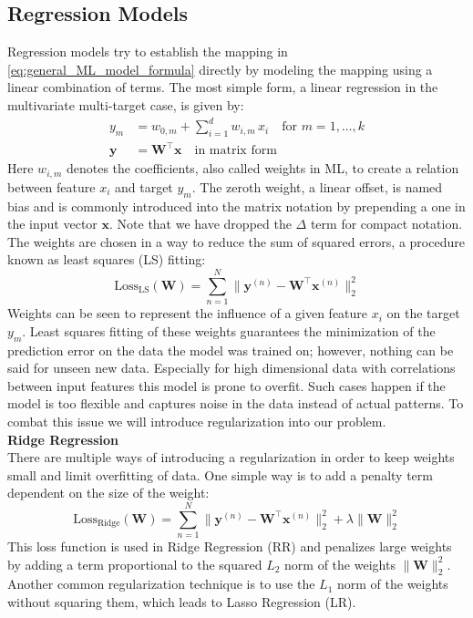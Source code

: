 \subsection{Regression Models}
\label{subsec:background_ml_model_types}
Regression models try to establish the mapping in \autoref{eq:general_ML_model_formula} directly by modeling the mapping using a linear combination of terms. The most simple form, a linear regression in the multivariate multi-target case, is given by: 
\begin{equation}
    \label{eq:linear_regression_formula}
    \begin{aligned}
        y_m &= w_{0, m} + \sum_{i=1}^d w_{i,m} \, x_i \quad \text{for } m = 1, \dots, k\\
        \mathbf{y} &= \mathbf{W^\top} \mathbf{x} \quad \text{in matrix form}
    \end{aligned}
\end{equation}
Here $w_{i,m}$ denotes the coefficients, also called weights in ML, to create a relation between feature $x_i$ and target $y_m$. The zeroth weight, a linear offset, is named bias and is commonly introduced into the matrix notation by prepending a one in the input vector $\mathbf{x}$. Note that we have dropped the $\Delta$ term for compact notation. The weights are chosen in a way to reduce the sum of squared errors, a procedure known as least squares (LS) fitting: 
\begin{equation}
    \label{eq:least_squares_error}
    \text{Loss}_\text{LS}(\mathbf{W}) = \sum_{n=1}^{N}\|\mathbf{y}^{(n)} - \mathbf{W^\top} \mathbf{x}^{(n)}\|_2^2
\end{equation}
Weights can be seen to represent the influence of a given feature $x_i$ on the target $y_m$. Least squares fitting of these weights guarantees the minimization of the prediction error on the data the model was trained on; however, nothing can be said for unseen new data. Especially for high dimensional data with correlations between input features this model is prone to overfit. Such cases happen if the model is too flexible and captures noise in the data instead of actual patterns. To combat this issue we will introduce regularization into our problem.\\

\textbf{Ridge Regression}\\
There are multiple ways of introducing a regularization in order to keep weights small and limit overfitting of data. One simple way is to add a penalty term dependent on the size of the weight: 
\begin{equation}
    \label{eq:regularized_least_squares_error}
    \text{Loss}_\text{Ridge}(\mathbf{W}) = \sum_{n=1}^{N}\|\mathbf{y}^{(n)} - \mathbf{W^\top} \mathbf{x}^{(n)}\|_2^2 + \lambda \|\mathbf{W}\|_2^2
\end{equation}
This loss function is used in Ridge Regression (RR) and penalizes large weights by adding a term proportional to the squared $L_2$ norm of the weights $\|\mathbf{W}\|_2^2$. Another common regularization technique is to use the $L_1$ norm of the weights without squaring them, which leads to Lasso Regression (LR). 

